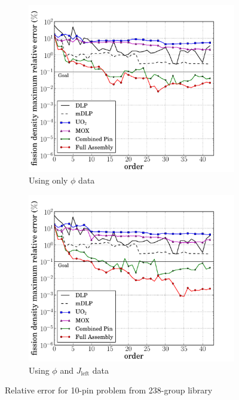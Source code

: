 \documentclass[5p,times,twocolumn,10pt]{elsarticle}
\begin{document}
    \begin{figure}[tb]
        \centering
        \begin{subfigure}{0.5\textwidth}
            \centering
            \includegraphics[trim=.1cm .25cm 2.0cm .4cm, clip=true,
            totalheight=0.261\textheight]
            {10pin_238_energy_basis_comparison_fission-44}
            \caption{Using only $\phi$ data}
            \label{fig:10pin-238a}
        \end{subfigure}%
        \begin{subfigure}{0.5\textwidth}
            \centering
            \includegraphics[trim=.1cm .25cm 2.0cm .4cm, clip=true,
            totalheight=0.261\textheight]
            {10pin_238_partial_energy_basis_comparison_fission-44}
            \caption{Using $\phi$ and $J_{\text{left}}$ data}
            \label{fig:10pin-238b}
        \end{subfigure}
        \caption{Relative error for 10-pin problem from 238-group library}
        \label{fig:10pin-238}
    \end{figure}
\end{document}
